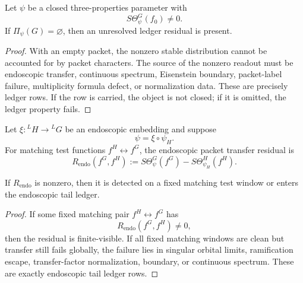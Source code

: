 \begin{theorem}
\label{thm:unified-reality-missing-packet-forces-ledger-contradiction}
Let $\psi$ be a closed three-properties parameter with
$$
S\Theta_\psi^G(f_0)\ne0.
$$
If $\Pi_\psi(G)=\varnothing$, then an unresolved ledger residual is
present.
\end{theorem}
\begin{proof}
With an empty packet, the nonzero stable distribution cannot be
accounted for by packet characters. The source of the nonzero readout
must be endoscopic transfer, continuous spectrum, Eisenstein boundary,
packet-label failure, multiplicity formula defect, or normalization
data. These are precisely ledger rows. If the row is carried, the object
is not closed; if it is omitted, the ledger property fails.
\end{proof}

\begin{definition}
\label{def:unified-reality-endoscopic-packet-transfer-residual}
Let $\xi:{}^LH\to{}^LG$ be an endoscopic embedding and suppose
$$
\psi=\xi\circ\psi_H.
$$
For matching test functions $f^H\leftrightarrow f^G$, the endoscopic
packet transfer residual is
$$
R_{\mathrm{endo}}(f^G,f^H)
:=
S\Theta_\psi^G(f^G)-S\Theta_{\psi_H}^H(f^H).
$$
\end{definition}

\begin{theorem}
\label{thm:unified-reality-endoscopic-transfer-residual-detection}
If $R_{\mathrm{endo}}$ is nonzero, then it is detected on a fixed
matching test window or enters the endoscopic tail ledger.
\end{theorem}
\begin{proof}
If some fixed matching pair $f^H\leftrightarrow f^G$ has
$$
R_{\mathrm{endo}}(f^G,f^H)\ne0,
$$
then the residual is finite-visible. If all fixed matching windows are
clean but transfer still fails globally, the failure lies in singular
orbital limits, ramification escape, transfer-factor normalization,
boundary, or continuous spectrum. These are exactly endoscopic tail
ledger rows.
\end{proof}

